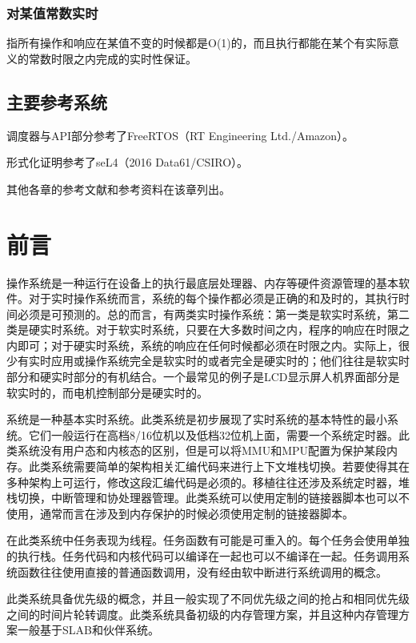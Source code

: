 \subsubsection{对某值常数实时}\label{subsubsec:value-constant-real-time}

指所有操作和响应在某值不变的时候都是O(1)的，而且执行都能在某个有实际意义的常数时限之内完成的实时性保证。

\subsection{主要参考系统}\label{subsec:major-reference-systems}

调度器与API部分参考了FreeRTOS（RT Engineering Ltd./Amazon）。

形式化证明参考了seL4（2016 Data61/CSIRO）。

其他各章的参考文献和参考资料在该章列出。

\section{前言}\label{sec:foreword}

操作系统是一种运行在设备上的执行最底层处理器、内存等硬件资源管理的基本软件。对于实时操作系统而言，系统的每个操作都必须是正确的和及时的，其执行时间必须是可预测的。总的而言，有两类实时操作系统：第一类是软实时系统，第二类是硬实时系统。对于软实时系统，只要在大多数时间之内，程序的响应在时限之内即可；对于硬实时系统，系统的响应在任何时候都必须在时限之内。实际上，很少有实时应用或操作系统完全是软实时的或者完全是硬实时的；他们往往是软实时部分和硬实时部分的有机结合。一个最常见的例子是LCD显示屏人机界面部分是软实时的，而电机控制部分是硬实时的。

系统是一种基本实时系统。此类系统是初步展现了实时系统的基本特性的最小系统。它们一般运行在高档8/16位机以及低档32位机上面，需要一个系统定时器。此类系统没有用户态和内核态的区别，但是可以将MMU和MPU配置为保护某段内存。此类系统需要简单的架构相关汇编代码来进行上下文堆栈切换。若要使得其在多种架构上可运行，修改这段汇编代码是必须的。移植往往还涉及系统定时器，堆栈切换，中断管理和协处理器管理。此类系统可以使用定制的链接器脚本也可以不使用，通常而言在涉及到内存保护的时候必须使用定制的链接器脚本。

在此类系统中任务表现为线程。任务函数有可能是可重入的。每个任务会使用单独的执行栈。任务代码和内核代码可以编译在一起也可以不编译在一起。任务调用系统函数往往使用直接的普通函数调用，没有经由软中断进行系统调用的概念。

此类系统具备优先级的概念，并且一般实现了不同优先级之间的抢占和相同优先级之间的时间片轮转调度。此类系统具备初级的内存管理方案，并且这种内存管理方案一般基于SLAB和伙伴系统。

